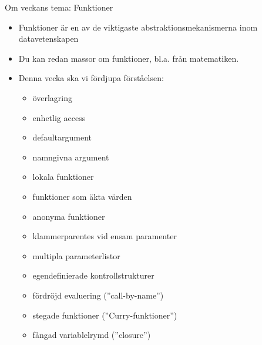 






\ifkompendium\else
\begin{SlideExtra}{Om veckans tema: Funktioner}
\begin{itemize}
  \item Funktioner är en av de viktigaste abstraktionsmekanismerna inom datavetenskapen
  \item Du kan redan massor om funktioner, bl.a. från matematiken.
  \item Denna vecka ska vi fördjupa förståelsen:
  \begin{itemize}
    \item överlagring
    \item enhetlig access
    \item defaultargument
    \item namngivna argument
    \item lokala funktioner
    \item funktioner som äkta värden
    \item anonyma funktioner
    \item klammerparentes vid ensam paramenter
    \item multipla parameterlistor
    \item egendefinierade kontrollstrukturer
    \item fördröjd evaluering (''call-by-name'')
    \item stegade funktioner (''Curry-funktioner'')
    \item fångad variablelrymd (''closure'')
    \end{itemize}
\end{itemize}  
\end{SlideExtra}

